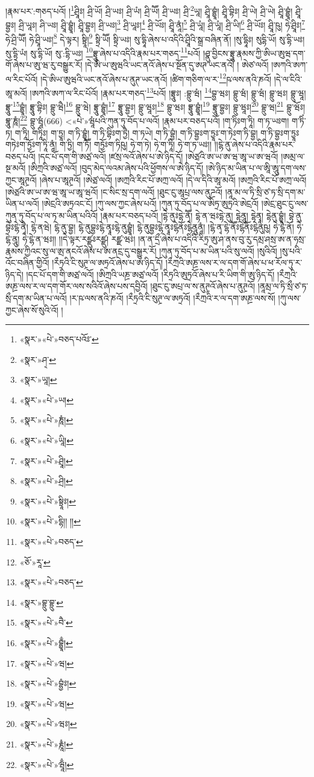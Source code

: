 །རྣམ་པར་:གཅད་པའོ། །\footnote{«སྣར་»«པེ་»བཅད་པའོཿ་}ཤྲཱིཿ། ཤྲི་ཡོ། ཤྲི་ཡཿ། ཤྲི་ཡཾ། ཤྲི་ཡཽ། ཤྲི་ཡཿ། ཤྲི་\footnote{«སྣར་»ཤ྄་}ཡཱ། ཤྲཱི་བྷྱཱཾ། ཤྲཱི་བྷིཿ། ཤྲི་ཡེ། ཤྲི་ཡེ། ཤྲཱི་བྷྱཱཾ། ཤྲཱི་བྷྱཿ། ཤྲི་ཡཱཿ། ཤི་ཡཿ། ཤྲཱི་བྷྱཱཾ། ཤྲཱི་བྷྱཿ། ཤྲི་ཡཿ།\footnote{«སྣར་»ཡཱ།} ཤྲི་ཡཱཿ།\footnote{«སྣར་»«པེ་»ཡ།} ཤྲི་ཡོཿ། ཤྲཱི་ནཱཾ།\footnote{«སྣར་»«པེ་»ཎཱཾ།} ཤྲི་ཡཱཾ། ཤྲི་ཡཱཾ། ཤྲི་ཡི།\footnote{«སྣར་»«པེ་»ཡཱི།} ཤྲི་ཡོཿ། ཤྲཱི་ཥུ། ཧེ་ཤྲཱིཿ།\footnote{«སྣར་»«པེ་»ཤྲཱི།} ཧེ་ཤྲི་ཡཽ། ཧེ་ཤྲཱི་ཡཿ།\footnote{«སྣར་»«པེ་»ཤྲི།} དེ་ལྟར། སྟྲཱི།\footnote{«སྣར་»«པེ་»སྟྲཱིཿ།} སྟྲི་ཡཽ། སྟྲི་ཡཿ། སུ་དྷཱི་ཞེས་པ་འདིའི་ཤྲཱིའི་སྒྲ་བཞིན་ནོ། །སུ་དྷཱིཿ། སུདྷི་ཡོ། སུ་དྷི་ཡཿ། སུ་དྷི་ཡཾ། སུ་དྷི་ཡོ། སུ་:དྷི་ཡཿ། \footnote{«སྣར་»«པེ་»དྷི།། །། }བྷྲཱུ་ཞེས་པ་འདིའི་རྣམ་པར་གཅད་\footnote{«སྣར་»«པེ་»བཅད་}པའོ། །ཤྣུ་བྱིངས་བྷྲཱུ་རྣམས་ཀྱི་ཨིཡ་ཨུཝ་དག་གོ་ཞེས་པ་ཨུ་ཝ་རུ་བསྒྱུར་རོ། །དེ་ཨི་ཡ་ཨུཝའི་ཡང་ནའོ་ཞེས་པ་སྔོན་དུ་ཨཊ་ཡང་ནའོ། །
ཨེཙ་ལའོ། །ཨཀའི་ཨཀ་ལ་རིང་པོའོ། །དེ་ཨིཡ་ཨུཝའི་ཡང་ནའོ་ཞེས་པ་ནུཊ་ཡང་ནའོ། །ཚིག་གཅིག་ལ་ར་\footnote{«ཅོ་»རཱ་}ཥ་ལས་ནའི་ཎའོ། །དེ་ལ་ངིའི་ཨཱ་མའོ། །ཨཀའི་ཨཀ་ལ་རིང་པོའོ། །རྣམ་པར་གཅད་\footnote{«སྣར་»«པེ་»བཅད་}པའོ། །བྷྲཱུཿ། :བྷྲུ་ཝཾ། \footnote{«སྣར་»བྷྲུ་བྷྲུ་}བྷྱ་ཝཿ། བྷྲུ་ཝཾ། བྷྲུ་ཝཾ། བྷྲུ་ཝཿ། བྷྲུ་ཝཱ། བྷྲཱུ་\footnote{«སྣར་»«པེ་»བཻ་}བྷྱཱཾ། བྷྲཱུ་བྷིཿ། བྷྲུ་ཝཻ།\footnote{«སྣར་»«པེ་»བྷྱཱྃ།} བྷྲུ་ཝེ། བྷྲཱུ་བྷྱཱཾ།\footnote{«སྣར་»«པེ་»ཝ།} བྷྲཱུ་བྷྱཿ། བྷྲུ་ཝཱཿ།\footnote{«སྣར་»«པེ་»བྷྱཾཿ།} བྷྲུ་ཝཿ། བྷྲཱུ་བྷྱཱཾ།\footnote{«སྣར་»«པེ་»ཝ།} བྷྲཱུ་བྷྱཿ། བྷྲུ་ཝཱཿ།\footnote{«སྣར་»«པེ་»ཝཿ།} བྷྲུ་ཝ།\footnote{«སྣར་»«པེ་»རྞཱཾ།} བྷྲུ་ཝོཿ། བྷཱུ་ཎཱཾ།\footnote{«སྣར་»«པེ་»ཝཱྃ།} བྷྲུ་ཝཱཾ(666) <«པེ་»ཝཱཾཔའི་ཀུན་ཏུ་བོད་པ་ལའོ། །རྣམ་པར་བཅད་པའོ། །ག་ཏིཿག་ཏཱི། ག་ཏ་ཡཿག། ག་ཏིཾ་ཏ། ག་ཏཱི། གཏཱིཿ། ག་ཏྱཱ། ག་ཏི་བྷྱཱཾ། ག་ཏི་བྷིཿག་ཏྱཻ། ག་ཏཡེ། ག་ཏི་བྷྱཾ། ག་ཏི་བྷྱཿག་ཏྱཱཿ་ག་ཏེཿག་ཏི་བྷྱ། ག་ཏི་བྷྱཿག་ཏྱཱཿགཏེཿག་ཏྱོཿག་ཏཱི་ནཱཾ། ག་ཏྱི། ག་ཏཽ། གཏྱོཿག་ཏིཥུ། ཧེ་ག་ཏེ། ཧེ་ག་ཏཱི། ཧེ་ག་ཏ་ཡཿ།། །།ངྷེ་ནུ་ཞེས་པ་འདིའི་རྣམ་པར་བཅད་པའོ། །དང་པོ་དག་གི་ཨཙྲ་ལའོ། །ཛསྲ་ལའོ་ཞེས་པ་ཨེ་ཉིད་དོ། །ཨེཙྲའི་ཨ་ཡ་ཨ་ཝ་ཨཱ་ཡ་ཨ་ཝའོ། །ཨམྲ་ལ་སྔ་མའོ། །ཨིཀྲའི་ཨཙྲ་ལའོ། །བུད་མེད་ལའམ་ཞེས་པའི་ཕྱོགས་ལ་ཨེ་ཉིད་དོ། །ཨེ་ཉིད་མ་ཡིན་པ་ལ་ཨཱི་ཨཱུ་དག་ལས་ཀྱང་ཨཱཊྲའོ། །ཞེས་པ་ཨཱཊྲའོ། །ཨེཙྲ་ལའོ། །ཨཀྲའི་རིང་པོ་ཨཀྲ་ལའོ། །དེ་ལ་དིའི་ཨཱ་མའོ། །ཨཀྲའི་རིང་པོ་ཨཀྲ་ལའོ། །ཨེཙྲའི་ཨ་ཡ་ཨ་ཝ་ཨཱ་ཡ་ཨཱ་ཝའོ། །ང་སིང་སྲ་དག་ལའོ། །ཐུང་ངུ་ཨཱཔྲ་ལས་ནུཌྲའོ། །ནཱ་མ་ལ་ཏི་སྲི་ཙ་ཏ་སྲི་དག་མ་ཡིན་པ་ལའོ། །ཨེངྲའི་ཨཏྲའང་ངོ། །ཀུ་ལས་ཀྱང་ཞེས་པའོ། །ཀུན་ཏུ་བོད་པ་ལ་ཨིཏྲ་ཨུཏྲའི་ཨེངྲའོ། །ཨེངྲ་ཐུང་ངུ་ལས་ཀུན་ཏུ་བོད་པ་ལ་ཏ་མ་ཡིན་པའིའོ། །རྣམ་པར་བཅད་པའོ། །དྷེ་ནུཿདྷེ་ནྭཽ། དྷེ་ན་ཝཿདྷེ་ནུ། དྷེནཱུ། དྷེནྭཱ། དྷེནུ་བྷྱཱཾ། བྷེ་ནུ་བྷེཿངྷེ་ནྭཻ། ངྷེ་ནཝེ། ངྷེ་ནུ་བྷྱ། ངྷེ་ནུབྷྱཿངྷེ་ནྭཱཿངྷེ་ནུབྷྱཱཾ། ངྷེ་ནུབྷྱཿངྷེ་ནྭཱཿངྷེནོཿངྷེནཱུནཱཾ། །ངྷེ་ནྭ་ངྷེ་ནཽཿངྷེནོཿངྷེནུཥུ། ཧེ་ངྷེ་ནོ། ཧེ་ངྷེ་ནཱུ། ཧེ་ངྷེ་ན་ཝཿ།། །།དེ་ལྟར་རཛྫུཿརཛྫུ། རཛྫ་ཝཿ། །ན་ན་དྲྀ་ཞེས་པ་འདིའི་རིཏྲ་ཨུ་ཤ་ནས་བུ་རུ་དམྲ་ཤསྲ་ཨ་ན་ཧསྲ་རྣམས་ཀྱིའང་སུ་ལ་ཨྲ་ནངའོ་ཞེས་པ་ཨ་ནངྲ་དུ་བསྒྱུར་རོ། །ཀུན་ཏུ་བོད་པ་མ་ཡིན་པའི་སུ་ལའོ། །སུའིའོ། །སུ་པའི་འོང་བཞིན་གྱིའོ། །རྀཏྲའི་ངི་སུཊྲ་ལ་ཨཏྲའོ་ཞེས་པ་ཨ་ཉིད་དོ། །རྀཀྲའི་ཨཎྲ་ལས་ར་ལ་དག་གོ་ཞེས་པ་ཕ་རོལ་ཏུ་ར་ཉིད་དེ། །དང་པོ་དག་གི་ཨཙྲ་ལའོ། །ཨིཀྲའི་ཡཎྲ་ཨཙྲ་ལའོ། །རིཏྲའི་ཨུཏྲའོ་ཞེས་པ་རི་ཡིག་གི་ཨུ་ཉིད་དོ། །རྀཀྲའི་ཨཎྲ་ལས་ར་ལ་དག་གོར་ལས་སའིའོ་ཞེས་པས་དབྱིའོ། །ཐུང་ངུ་ཨཔྲ་ལ་ས་ནུཊྲའོ་ཞེས་པ་ནུཊྲའོ། །ནཱམྲ་ལ་ཏི་སྲྀ་ཙ་ཏ་སྲྀ་དག་མ་ཡིན་པ་ལའོ། །ར་ཥ་ལས་ནའི་ཎའོ། །རྀཏྲའི་ངི་སུཊྲ་ལ་ཨཏྲའོ། །རྀཀྲའི་ར་ལ་དག་ཨཎྲ་ལས་སོ། །ཀུ་ལས་ཀྱང་ཞེས་སོ་སུའི་འོ། །
